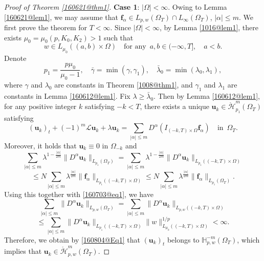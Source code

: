 \documentclass[reqno]{amsart}
\numberwithin{equation}{section}
\theoremstyle{plain}
\theoremstyle{definition}
\theoremstyle{remark}
\begin{document}
\begin{proof}[Proof of Theorem \ref{160621@thm1}]
{\bf{Case 1}}: $|\Omega|<\infty$.
Owing to Lemma \ref{160621@lem1}, we may assume that ${\boldsymbol{f}}_\alpha\in L_{p,w}(\Omega_T)\cap L_\infty(\Omega_T)$, $|\alpha|\le m$.
We first prove the theorem for $T<\infty$.
Since $|\Omega|<\infty$, by Lemma \ref{1016@lem1}, there exists $\mu_0=\mu_0(p,K_0,K_2)>1$ such that 
\begin{equation}		\label{160703@eq1}
w\in L_{\mu_0}((a,b)\times \Omega) \quad \text{for any }\, a,b\in(-\infty,T], \quad  a<b.
\end{equation}
Denote 
$$
p_1=\frac{p\mu_0}{\mu_0-1}, \quad \bar{\gamma}=\min(\gamma, \gamma_1), \quad \bar{\lambda}_0=\min(\lambda_0,\lambda_1),
$$
where $\gamma$ and $\lambda_0$ are constants in Theorem \ref{1008@thm1}, and $\gamma_1$ and $\lambda_1$ are constants in Lemma \ref{160612@lem1}.
Fix $\lambda\ge \bar{\lambda}_0$. 
Then by Lemma \ref{160612@lem1}, for any  positive integer $k$ satisfying $-k<T$, there exists a unique ${\boldsymbol{u}}_k\in \mathring{\mathcal{H}}^m_{p_1}(\Omega_T)$ satisfying 
\begin{equation}		\label{160804@Eq1}
({\boldsymbol{u}}_k)_t+(-1)^m{\mathcal{L}}{\boldsymbol{u}}_k+\lambda{\boldsymbol{u}}_k=\sum_{|\alpha| \le m}D^\alpha (I_{(-k,T)\times \Omega}{\boldsymbol{f}}_\alpha) \quad \text{in }\,  \Omega_T.
\end{equation}
Moreover, it holds that  ${\boldsymbol{u}}_k\equiv 0$ in $\Omega_{-k}$ and 
$$
\sum_{|\alpha|\le m}\lambda^{1-\frac{|\alpha|}{2m}}\|D^\alpha {\boldsymbol{u}}_k\|_{L_{p_1}(\Omega_T)}=\sum_{|\alpha|\le m}\lambda^{1-\frac{|\alpha|}{2m}}\|D^\alpha {\boldsymbol{u}}_k\|_{L_{p_1}((-k,T)\times \Omega)}
$$
$$
\le N\sum_{|\alpha|\le m}\lambda^{\frac{|\alpha|}{2m}}\|{\boldsymbol{f}}_\alpha\|_{L_{p_1}((-k,T)\times \Omega)}\le N\sum_{|\alpha|\le m}\lambda^{\frac{|\alpha|}{2m}}\|{\boldsymbol{f}}_\alpha\|_{L_{p_1}(\Omega_T)}.
$$
Using this together with \eqref{160703@eq1}, we have 
$$
\sum_{|\alpha|\le m}\|D^\alpha {\boldsymbol{u}}_k\|_{L_{p,w}(\Omega_T)}=\sum_{|\alpha|\le m}\|D^\alpha {\boldsymbol{u}}_k\|_{L_{p,w}((-k,T)\times \Omega)}
$$
\begin{equation}		\label{160918@eq1}
\le \sum_{|\alpha|\le m}\|D^\alpha {\boldsymbol{u}}_k\|_{L_{p_1}((-k,T)\times \Omega)}\|w\|_{L_{\mu_0}((-k,T)\times \Omega)}^{1/p}<\infty.
\end{equation}
Therefore, we obtain by \eqref{160804@Eq1} that $({\boldsymbol{u}}_k)_t$ belongs to ${\mathbb{H}}^{-m}_{p,w}(\Omega_T)$,
which implies that ${\boldsymbol{u}}_k\in \mathring{\mathcal{H}}^m_{p,w}(\Omega_T)$.

\end{proof}
\end{document}
